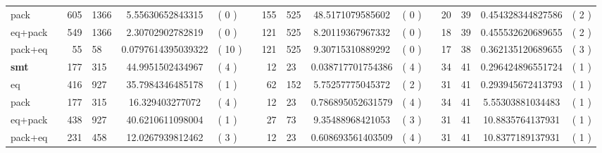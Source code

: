 \begin{tabularx}{\textwidth}{l*{3}{Xr@{/}lS[table-format=2.3, round-mode=places, round-precision=3]@{}>{(}l<{)}}}
       pack    & & 605 & 1366 & 5.55630652843315   &  0 & & 155 & 525 & 48.5171079585602  & 0 & & 20 & 39 & 0.454328344827586   & 2 \\
       eq+pack & & 549 & 1366 & 2.30702902782819   &  0 & & 121 & 525 & 8.20119367967332  & 0 & & 18 & 39 & 0.455532620689655   & 2 \\
       pack+eq & &  55 &   58 & 0.0797614395039322 & 10 & & 121 & 525 & 9.30715310889292  & 0 & & 17 & 38 & 0.362135120689655   & 3 \\
\midrule
\textbf{smt}   & & 177 &  315 & 44.9951502434967   &  4 & &  12 &  23 & 0.038717701754386 & 4 & & 34 & 41 & 0.296424896551724   & 1 \\
       eq      & & 416 &  927 & 35.7984346485178   &  1 & &  62 & 152 & 5.75257775045372  & 2 & & 31 & 41 & 0.293945672413793   & 1 \\
       pack    & & 177 &  315 & 16.329403277072    &  4 & &  12 &  23 & 0.786895052631579 & 4 & & 34 & 41 & 5.55303881034483    & 1 \\
       eq+pack & & 438 &  927 & 40.6210611098004   &  1 & &  27 &  73 & 9.35488968421053  & 3 & & 31 & 41 & 10.8835764137931    & 1 \\
       pack+eq & & 231 &  458 & 12.0267939812462   &  3 & &  12 &  23 & 0.608693561403509 & 4 & & 31 & 41 & 10.8377189137931    & 1 \\
\bottomrule
\end{tabularx} 
